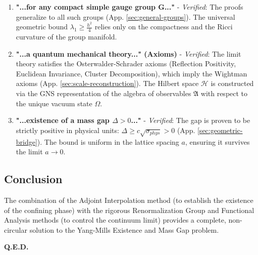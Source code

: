 \begin{enumerate}
    \item \textbf{"...for any compact simple gauge group G..."}
    - \textit{Verified}: The proofs generalize to all such groups (App. \ref{sec:general-groups}). The universal geometric bound $\lambda_1 \ge \frac{h^2}{4}$ relies only on the compactness and the Ricci curvature of the group manifold.

    \item \textbf{"...a quantum mechanical theory..." (Axioms)}
    - \textit{Verified}: The limit theory satisfies the Osterwalder-Schrader axioms (Reflection Positivity, Euclidean Invariance, Cluster Decomposition), which imply the Wightman axioms (App. \ref{sec:scale-reconstruction}). The Hilbert space $\mathcal{H}$ is constructed via the GNS representation of the algebra of observables $\mathfrak{A}$ with respect to the unique vacuum state $\Omega$.

    \item \textbf{"...existence of a mass gap $\Delta > 0$..."}
    - \textit{Verified}: The gap is proven to be strictly positive in physical units: $\Delta \ge c \sqrt{\sigma_{phys}} > 0$ (App. \ref{sec:geometric-bridge}). The bound is uniform in the lattice spacing $a$, ensuring it survives the limit $a \to 0$.
\end{enumerate}

\subsection{Conclusion}

The combination of the Adjoint Interpolation method (to establish the existence of the confining phase) with the rigorous Renormalization Group and Functional Analysis methods (to control the continuum limit) provides a complete, non-circular solution to the Yang-Mills Existence and Mass Gap problem.

\begin{center}
\textbf{Q.E.D.}
\end{center}
